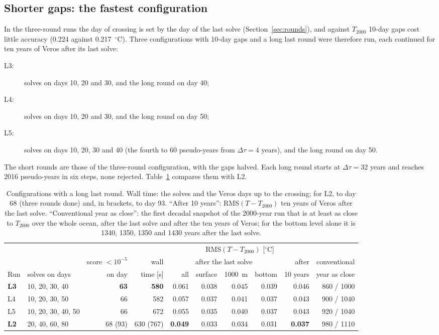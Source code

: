 \documentclass{article}
\begin{document}
\subsection{Shorter gaps: the fastest configuration}\label{sec:fast}

In the three-round runs the day of crossing is set by the day of the last solve (Section~\ref{sec:rounds}), and against $T_{2000}$ 10-day gaps cost little accuracy (0.224 against 0.217~$^\circ$C). Three configurations with 10-day gaps and a long last round were therefore run, each continued for ten years of Veros after its last solve:
\begin{description}
\item[L3:] solves on days 10, 20 and 30, and the long round on day 40;
\item[L4:] solves on days 10, 20 and 30, and the long round on day 50;
\item[L5:] solves on days 10, 20, 30 and 40 (the fourth to 60 pseudo-years from $\Delta\tau=4$ years), and the long round on day 50.
\end{description}
The short rounds are those of the three-round configuration, with the gaps halved. Each long round starts at $\Delta\tau=32$ years and reaches 2016 pseudo-years in six steps, none rejected. Table~\ref{tab:fast} compares them with L2.

\begin{table}[h]
\centering
\small
\setlength{\tabcolsep}{4pt}
\renewcommand{\arraystretch}{1.2}
\begin{tabular}{l|l|r|r|rrrr|r|r}
\toprule
 & & & & \multicolumn{5}{c|}{RMS$(T-T_{2000})$ [$^\circ$C]} & \\
\cmidrule{5-9}
 & & score $<10^{-5}$ & wall & \multicolumn{4}{c|}{after the last solve} & after & conventional \\
\cmidrule{5-8}
Run & solves on days & on day & time [s] & all & surface & 1000~m & bottom & 10 years & year as close \\
\midrule
\textbf{L3} & 10, 20, 30, 40 & \textbf{63} & \textbf{580} & 0.061 & 0.038 & 0.045 & 0.039 & 0.046 & 860 / 1000 \\
L4 & 10, 20, 30, 50 & 66 & 582 & 0.057 & 0.037 & 0.041 & 0.037 & 0.043 & 900 / 1040 \\
L5 & 10, 20, 30, 40, 50 & 66 & 672 & 0.055 & 0.035 & 0.040 & 0.037 & 0.043 & 920 / 1040 \\
\textbf{L2} & 20, 40, 60, 80 & 68 (93) & 630 (767) & \textbf{0.049} & 0.033 & 0.034 & 0.031 & \textbf{0.037} & 980 / 1110 \\
\bottomrule
\end{tabular}
\caption{Configurations with a long last round. Wall time: the solves and the Veros days up to the crossing; for L2, to day 68 (three rounds done) and, in brackets, to day 93. ``After 10 years'': RMS$(T-T_{2000})$ ten years of Veros after the last solve. ``Conventional year as close'': the first decadal snapshot of the 2000-year run that is at least as close to $T_{2000}$ over the whole ocean, after the last solve and after the ten years of Veros; for the bottom level alone it is 1340, 1350, 1350 and 1430 years after the last solve.}
\label{tab:fast}
\end{table}
\end{document}
